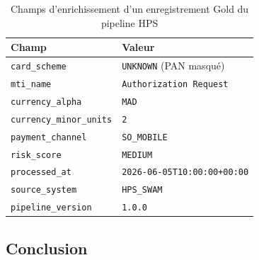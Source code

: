 \vspace{0.3cm}
\begin{table}[H]
\centering
\renewcommand{\arraystretch}{1.5}
\begin{tabular}{|l|l|}
\hline
\textbf{Champ} & \textbf{Valeur} \\
\hline
\texttt{card\_scheme}        & \texttt{UNKNOWN} (PAN masqué) \\
\texttt{mti\_name}           & \texttt{Authorization Request} \\
\texttt{currency\_alpha}     & \texttt{MAD} \\
\texttt{currency\_minor\_units} & \texttt{2} \\
\texttt{payment\_channel}    & \texttt{SO\_MOBILE} \\
\texttt{risk\_score}         & \texttt{MEDIUM} \\
\texttt{processed\_at}       & \texttt{2026-06-05T10:00:00+00:00} \\
\texttt{source\_system}      & \texttt{HPS\_SWAM} \\
\texttt{pipeline\_version}   & \texttt{1.0.0} \\
\hline
\end{tabular}
\caption{Champs d'enrichissement d'un enregistrement Gold du pipeline HPS}
\label{tab:goldRecord}
\end{table}

\newpage

\subsection*{Conclusion}
{}
\vspace{0.5cm}

